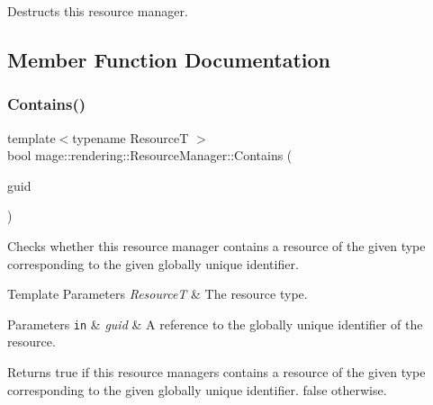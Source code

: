 Destructs this resource manager. 

\subsection{Member Function Documentation}
\mbox{\label{classmage_1_1rendering_1_1_resource_manager_a7df24baa95d7a43697cba243dd5b5a54}} 
\subsubsection{\texorpdfstring{Contains()}{Contains()}}
{\footnotesize\ttfamily template$<$typename ResourceT $>$ \\
bool mage\+::rendering\+::\+Resource\+Manager\+::\+Contains (\begin{DoxyParamCaption}\item[{const typename \mbox{\hyperlink{classmage_1_1rendering_1_1_resource_manager_a097b505b275b411e02c73d1899e91a44}{key\+\_\+type}}$<$ ResourceT $>$ \&}]{guid }\end{DoxyParamCaption})\hspace{0.3cm}{\ttfamily [noexcept]}}

Checks whether this resource manager contains a resource of the given type corresponding to the given globally unique identifier.


\begin{DoxyTemplParams}{Template Parameters}
{\em ResourceT} & The resource type. \\
\hline
\end{DoxyTemplParams}

\begin{DoxyParams}[1]{Parameters}
\mbox{\tt in}  & {\em guid} & A reference to the globally unique identifier of the resource. \\
\hline
\end{DoxyParams}
\begin{DoxyReturn}{Returns}
{\ttfamily true} if this resource managers contains a resource of the given type corresponding to the given globally unique identifier. {\ttfamily false} otherwise. 
\end{DoxyReturn}
\mbox{\label{classmage_1_1rendering_1_1_resource_manager_aeb229ae49bde59cb6c146f9749851363}} 
